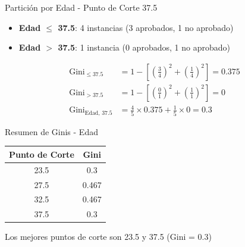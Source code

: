 \documentclass{beamer}
\begin{document}
\begin{frame}{Partición por Edad - Punto de Corte 37.5}
    \begin{itemize}
        \item \textbf{Edad $\leq$ 37.5}: 4 instancias (3 aprobados, 1 no aprobado)
        \item \textbf{Edad $>$ 37.5}: 1 instancia (0 aprobados, 1 no aprobado)
    \end{itemize}
    
    \vspace{0.5em}
    
    \begin{align*}
        \mathrm{Gini}_{\leq 37.5} &= 1 - \left[\left(\tfrac{3}{4}\right)^2 + \left(\tfrac{1}{4}\right)^2\right] = 0.375 \\
        \mathrm{Gini}_{> 37.5} &= 1 - \left[\left(\tfrac{0}{1}\right)^2 + \left(\tfrac{1}{1}\right)^2\right] = 0 \\
        \mathrm{Gini}_{\text{Edad, 37.5}} &= \tfrac{4}{5}\times0.375 + \tfrac{1}{5}\times0 = 0.3
    \end{align*}
\end{frame}

\begin{frame}{Resumen de Ginis - Edad}
    \begin{center}
        \begin{tabular}{cc}
            \toprule
            Punto de Corte & Gini \\
            \midrule
            23.5 & 0.3 \\
            27.5 & 0.467 \\
            32.5 & 0.467 \\
            37.5 & 0.3 \\
            \bottomrule
        \end{tabular}
    \end{center}
    
    \vspace{1em}
    
    Los mejores puntos de corte son 23.5 y 37.5 (Gini = 0.3)
\end{frame}
\end{document}
